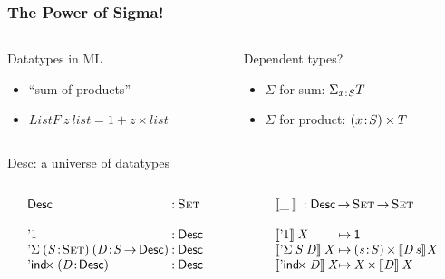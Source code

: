 \documentclass{beamer}
\begin{document}


\begin{frame}

\frametitle{The Power of Sigma!}

\begin{columns}
  \begin{column}{5cm}
    \begin{block}{Datatypes in ML}
      \begin{itemize}
      \item ``sum-of-products''
      \item \(\mathit{ListF}\: z\: \mathit{list} = 1 + z \times \mathit{list}\)
      \end{itemize}
    \end{block}
  \end{column}
  \begin{column}{6cm}
    \begin{block}{Dependent types?}
    \begin{itemize}
    \item \(\Sigma\) for sum: \(\Sigma_{x\:\!:\!\:S} T\)
    \item \(\Sigma\) for product: \((x\!:\!S) \times T\)
    \end{itemize}
    \end{block}
  \end{column}
\end{columns}

\begin{block}{Desc: a universe of datatypes}

\begin{columns}
  \begin{column}{5cm}
\[\stk{
\begin{array}{@{}l@{\::\:}l}
\Desc    & \Set  \\
\multicolumn{2}{l}{} \\
\DUnit   & \Desc \\
\DSigma{(\Bhab{\V{S}}{\Set})}{(\Bhab{\V{D}}{\V{S} \To \Desc})} 
         & \Desc \\
\DIndx{(\Bhab{\V{D}}{\Desc})} 
         & \Desc \\
\end{array}
}\]
  \end{column}
  \begin{column}{5cm}
\[\stk{
\begin{array}{l@{\mapsto\:}l}     
\multicolumn{2}{l}{\descop{\_\:}{} : \Desc \To \Set \To \Set} \\
\multicolumn{2}{l}{} \\
 \descop{\DUnit}{\V{X}}                &  
     \Unit \\
 \descop{\DSigma{\V{S}}{\V{D}}}{\V{X}} &
     \SIGMAS{\Bhab{\V{s}}{\V{S}}}{\descop{\V{D}\,\V{s}}{\!\V{X}}}  \\
\descop{\DIndx{\V{D}}}{\V{X}}          &  
     \TIMES{\V{X}}{\descop{\V{D}}{\V{X}}}
\end{array}
}\]
  \end{column}  
\end{columns}


\end{block}
\end{frame}
\end{document}
